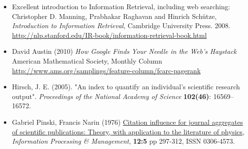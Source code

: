 \documentclass[a4paper,landscape,headrule,footrule,xetex]{foils}
\begin{document}




\begin{itemize}
\item Excellent introduction to Information Retrieval, including web searching:
\\ Christopher D. Manning, Prabhakar Raghavan and Hinrich Schütze, \textit{Introduction to Information Retrieval}, Cambridge University Press. 2008. 
\\ \url{http://nlp.stanford.edu/IR-book/information-retrieval-book.html}
\item David Austin (2010) \textit{How Google Finds Your Needle in the Web's Haystack}
American Mathematical Society, Monthly Column 
\\ \url{http://www.ams.org/samplings/feature-column/fcarc-pagerank}
\item Hirsch, J. E. (2005). "An index to quantify an individual's scientific research output". \textit{Proceedings of the National Academy of Science} \textbf{102(46)}: 16569–16572. 
\item Gabriel Pinski, Francis Narin (1976)
\href{https://doi.org/10.1016/0306-4573(76)90048-0}{Citation influence for journal aggregates of scientific publications: Theory, with application to the literature of physics},
\textit{Information Processing \& Management},
\textbf{12:5}  pp 297-312, ISSN 0306-4573.


\end{itemize}
\end{document}
